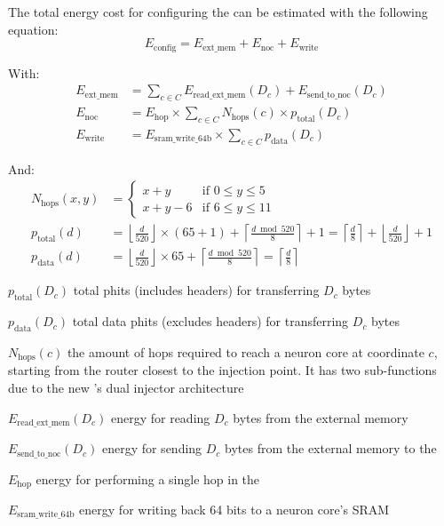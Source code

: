 The total energy cost for configuring the \graicore{} can be estimated with the following equation:
\begin{equation}
    E_{\textrm{config}} = E_{\textrm{ext\_mem}} + E_{\textrm{noc}} + E_{\textrm{write}}
\end{equation}

With:
\begin{align*} 
E_{\textrm{ext\_mem}} &= 
        \sum_{c \in C}^{}{E_\textrm{read\_ext\_mem}(D_c) + E_{\textrm{send\_to\_noc}}(D_c)} \\
E_{\textrm{noc}} &=
    E_{\textrm{hop}} \times \sum_{c \in C}^{}{N_\textrm{hops}(c) \times p_{\textrm{total}}(D_c)} \\
E_{\textrm{write}} &=
    E_{\textrm{sram\_write\_64b}} \times \sum_{c \in C}^{}{p_{\textrm{data}}(D_c)}
\end{align*}

And:
\begin{align*} 
N_{\textrm{hops}}(x,y) &=
    \begin{cases} 
        x + y & \textrm{if } 0 \leq y \leq 5 \\
        x + y - 6 & \text{if } 6 \leq y \leq 11
    \end{cases}
\\
p_{\textrm{total}}(d) &=
    \left\lfloor \frac{d}{520} \right\rfloor \times (65 + 1) + \left\lceil \frac{d \bmod 520}{8} \right\rceil + 1 =
    \left\lceil \frac{d}{8} \right\rceil + \left\lfloor \frac{d}{520} \right\rfloor + 1 
\\
p_{\textrm{data}}(d) &=
    \left\lfloor \frac{d}{520} \right\rfloor \times 65 + \left\lceil \frac{d \bmod 520}{8} \right\rceil =
    \left\lceil \frac{d}{8} \right\rceil
\end{align*}

\begin{eqexpl}[15mm]
    \item{$p_{\textrm{total}}(D_c)$} total phits (includes headers) for transferring $D_c$ bytes
    \item{$p_{\textrm{data}}(D_c)$} total data phits (excludes headers) for transferring $D_c$ bytes
    \item{$N_{\textrm{hops}}(c)$} the amount of hops required to reach a neuron core at coordinate $c$, starting from the router closest to the injection point. It has two sub-functions due to the new \confignoc{}'s dual injector architecture
    \item{$E_{\textrm{read\_ext\_mem}}(D_c)$} energy for reading $D_c$ bytes from the external memory
    \item{$E_{\textrm{send\_to\_noc}}(D_c)$} energy for sending $D_c$ bytes from the external memory to the \confignoc{}
    \item{$E_{\textrm{hop}}$} energy for performing a single hop in the \confignoc{}
    \item{$E_{\textrm{sram\_write\_64b}}$} energy for writing back 64 bits to a neuron core's SRAM
\end{eqexpl}

